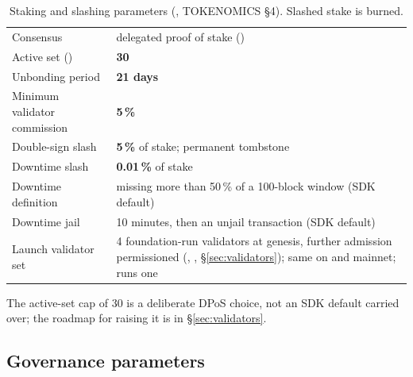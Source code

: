 \begin{table}[H]
\centering
\small
\begin{tabularx}{\textwidth}{@{}lL@{}}
\toprule
Consensus & delegated proof of stake () \\
Active set () & \textbf{30} \\
Unbonding period & \textbf{21 days} \\
Minimum validator commission & \textbf{5\,\%} \\
Double-sign slash & \textbf{5\,\%} of stake; permanent tombstone \\
Downtime slash & \textbf{0.01\,\%} of stake \\
Downtime definition & missing more than 50\,\% of a 100-block window (SDK default) \\
Downtime jail & 10 minutes, then an unjail transaction (SDK default) \\
Launch validator set & 4 foundation-run validators at genesis, further admission permissioned (, , \S\ref{sec:validators}); same on  and mainnet;  runs one \\
\bottomrule
\end{tabularx}
\caption{Staking and slashing parameters (, TOKENOMICS \S4). Slashed
stake is burned.}
\end{table}

The active-set cap of 30 is a deliberate DPoS choice, not an SDK default
carried over; the roadmap for raising it is in \S\ref{sec:validators}.

\subsection{Governance parameters}
\label{sec:governance}

